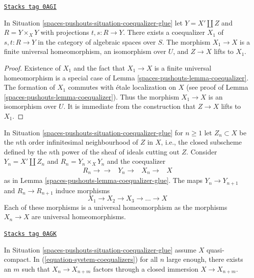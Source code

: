\begin{lemma}
\label{spaces-pushouts-lemma-coequalizer-glue}
\href{https://stacks.math.columbia.edu/tag/0AGI}{\texttt{Stacks tag 0AGI}}

In Situation \ref{spaces-pushouts-situation-coequalizer-glue} let $Y = X' \amalg Z$ and
$R = Y \times_X Y$ with projections $t, s : R \to Y$. There exists a
coequalizer $X_1$ of $s, t : R \to Y$ in the category of algebraic spaces
over $S$. The morphism $X_1 \to X$ is a finite universal homeomorphism,
an isomorphism over $U$, and $Z \to X$ lifts to $X_1$.
\end{lemma}

\begin{proof}
Existence of $X_1$ and the fact that $X_1 \to X$ is a finite
universal homeomorphism is a special case of Lemma \ref{spaces-pushouts-lemma-coequalizer}.
The formation of $X_1$ commutes with \'etale localization on $X$
(see proof of Lemma \ref{spaces-pushouts-lemma-coequalizer}).
Thus the morphism $X_1 \to X$ is an isomorphism over $U$.
It is immediate from the construction that $Z \to X$ lifts to $X_1$.
\end{proof}

In Situation \ref{spaces-pushouts-situation-coequalizer-glue} for $n \geq 1$ let
$Z_n \subset X$ be the $n$th order infinitesimal neighbourhood
of $Z$ in $X$, i.e., the closed subscheme defined by the $n$th
power of the sheaf of ideals cutting out $Z$. Consider $Y_n = X' \amalg Z_n$
and $R_n = Y_n \times_X Y_n$ and the coequalizer
$$
\begin{array}{cccc}R_n \longrightarrow\longrightarrow & Y_n \longrightarrow & X_n \longrightarrow & X\end{array}
$$
as in Lemma \ref{spaces-pushouts-lemma-coequalizer-glue}. The maps $Y_n \to Y_{n + 1}$
and $R_n \to R_{n + 1}$ induce morphisms
\begin{equation}
\label{equation-system-coequalizers}
X_1 \to X_2 \to X_3 \to \ldots \to X
\end{equation}
Each of these morphisms is a universal homeomorphism as the morphisms
$X_n \to X$ are universal homeomorphisms.

\begin{lemma}
\label{spaces-pushouts-lemma-essentially-constant}
\href{https://stacks.math.columbia.edu/tag/0AGK}{\texttt{Stacks tag 0AGK}}

In Situation \ref{spaces-pushouts-situation-coequalizer-glue} assume $X$ quasi-compact.
In (\ref{equation-system-coequalizers}) for all $n$ large enough, there
exists an $m$ such that $X_n \to X_{n + m}$ factors through a
closed immersion $X \to X_{n + m}$.
\end{lemma}

